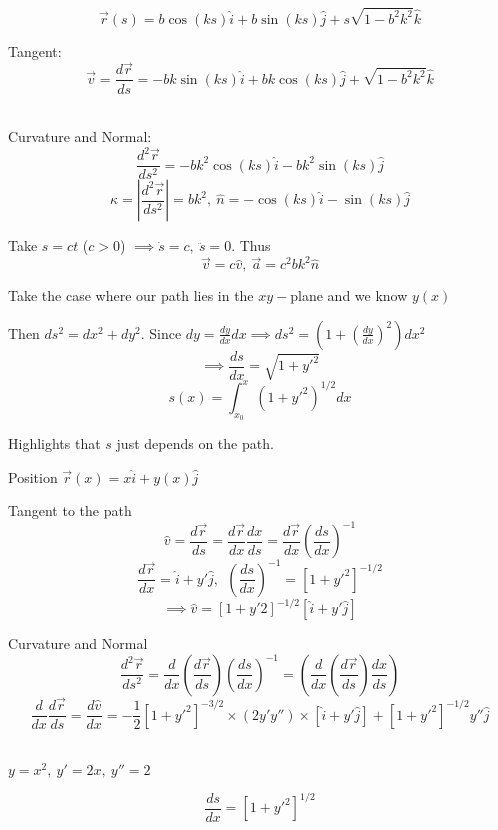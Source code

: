 \begin{example}
	\[\vec{r}(s) = b\cos(ks)\hat{i} + b\sin(ks)\hat{j} + s\sqrt{1-b^2k^2}\hat{k}\]
	
	Tangent:
	\[\vec{v} = \frac{d\vec{r}}{ds} = -bk\sin(ks)\hat{i} + bk\cos(ks)\hat{j} + \sqrt{1-b^2k^2}\hat{k}\]~
	
	Curvature and Normal:
	\[\frac{d^2\vec{r}}{ds^2} = -bk^2\cos(ks)\hat{i} -bk^2 \sin(ks)\hat{j}\]
	\[\kappa =\left|\frac{d^2\vec{r}}{ds^2}\right| = bk^2,~ \hat{n} =  -\cos(ks)\hat{i} -\sin(ks)\hat{j}\]
	
Take $s = ct$ ($c >0$) $ \implies \dot{s} =c,~ \ddot{s} = 0$. Thus
\[\vec{v} = c\hat{v},~\vec{a} = c^2bk^2\hat{n}\]	
\end{example}

Take the case where our path lies in the $xy-$plane and we know $y(x)$
\vspace*{100pt}

Then $ds^2 = dx^2 + dy^2$. Since $dy = \frac{dy}{dx}dx \implies ds^2 = (1 + (\frac{dy}{dx})^2 )dx^2$
\[\implies \frac{ds}{dx} = \sqrt{1 + y'^2}\]
\[s(x) = \int_{x_0}^x (1 + y'^2)^{1/2}dx\]

Highlights that $s$ just depends on the path. 


Position $\vec{r}(x) = x\hat{i} + y(x)\hat{j}$

Tangent to the path
\[\hat{v} = \frac{d\vec{r}}{ds} = \frac{d\vec{r}}{dx}\frac{dx}{ds} = \frac{d\vec{r}}{dx}\left(\frac{ds}{dx}\right)^{-1}\]
\[\frac{d\vec{r}}{dx} = \hat{i} + y'\hat{j},~~\left(\frac{ds}{dx}\right)^{-1} = [1 + y'^2]^{-1/2}\]
\[\implies \hat{v} = [1+y'2]^{-1/2}[\hat{i} + y'\hat{j}]\]

Curvature and Normal
\[\frac{d^2\vec{r}}{ds^2} = \frac{d}{dx}\left(\frac{d\vec{r}}{ds}\right)\left(\frac{ds}{dx}\right)^{-1} = \left(\frac{d}{dx}\left(\frac{d\vec{r}}{ds}\right)\frac{dx}{ds}\right)\]
\[\frac{d}{dx}\frac{d\vec{r}}{ds} = \frac{d\hat{v}}{dx} = -\frac{1}{2}[1+y'^2]^{-3/2} \times (2y'y'')\times [\hat{i} + y'\hat{j}] + [1 + y'^2]^{-1/2}y''\hat{j}\]~


\begin{example}
$y = x^2,~y' = 2x,~ y'' = 2$

\[\frac{ds}{dx} = [1 + y'^2]^{1/2}\]	
\end{example}








